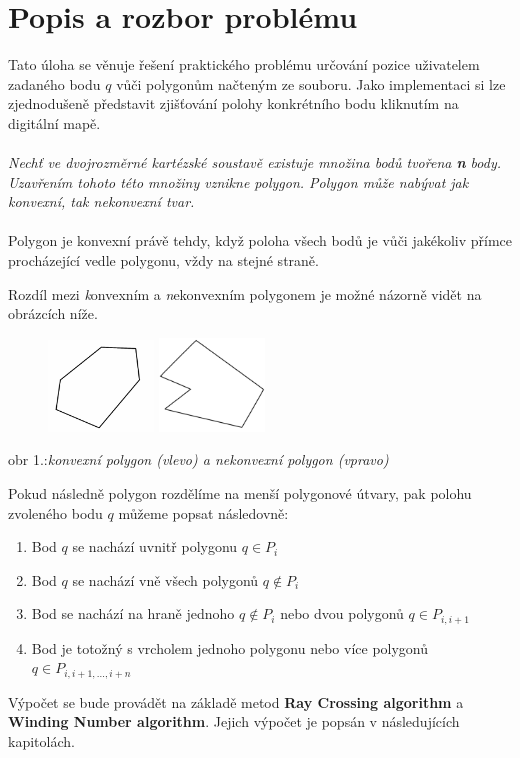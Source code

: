 \documentclass{article}
\begin{document}
\section{Popis a rozbor problému} %
\indent 
Tato úloha se věnuje řešení praktického problému určování pozice uživatelem zadaného bodu $q$ vůči polygonům načteným ze souboru. Jako implementaci si lze zjednodušeně představit zjišťování polohy konkrétního bodu kliknutím na digitální mapě. 
\\
\\
\textsl{Nechť ve dvojrozměrné kartézské soustavě existuje množina bodů tvořena \textbf n body. Uzavřením tohoto této množiny vznikne polygon. Polygon může nabývat jak konvexní, tak nekonvexní tvar.}
\\
\\
Polygon je konvexní právě tehdy, když poloha všech bodů je vůči jakékoliv přímce procházející vedle polygonu, vždy na stejné straně. 

Rozdíl mezi \textsl konvexním a  \textsl nekonvexním polygonem je možné názorně vidět na obrázcích níže.
\begin{figure}[htbp]
\centering
        \includegraphics[clip, trim=0cm 0cm 0cm 0cm, width=0.2500\textwidth]{obrazek1.png}
 \includegraphics[clip, trim=0cm 0cm 0cm 0cm, width=0.2500\textwidth]{obrazek2.png}
\end{figure}
\bigskip
\begin{center}
obr 1.:\textsl{konvexní polygon (vlevo) a nekonvexní polygon (vpravo)}
\end{center}
Pokud následně polygon rozdělíme na menší polygonové útvary, pak polohu zvoleného bodu $q$ můžeme popsat následovně: 
\begin{enumerate}
\item   Bod $q$ se nachází uvnitř polygonu  $q {\in} P_i$ 
\item   Bod $q$ se nachází vně všech polygonů  $q {\not \in} P_i$ 
\item   Bod se nachází na hraně jednoho  $q {\not \in} P_i$ nebo dvou polygonů $q {\in} P_{i,i+1}$ 
\item   Bod je totožný s vrcholem jednoho polygonu nebo více polygonů $q {\in} P_{i,i+1,...,i+n}$
\end{enumerate}
Výpočet se bude provádět na základě metod \textbf {Ray Crossing algorithm} a  \textbf {Winding Number algorithm}. Jejich výpočet je popsán v následujících kapitolách. 
\\
\clearpage
\end{document}
